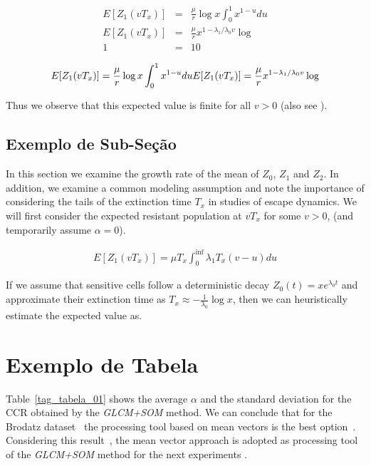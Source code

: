 \documentclass{classe_cn}                 %
\begin{document}
\begin{eqnarray}
\label{eqexpmuts}
  E [Z_1(vT_x)] &=& \frac{\mu}{r}\log x \int_0^{1} x^{1-u} du \\
  E [Z_1(vT_x)] &=& \frac{\mu}{r}x^{1-{\lambda_1}/{\lambda_0}v}\log  \\
  1 &=& 10
\end{eqnarray}

\begin{equation}
  E [Z_1(vT_x)] = \frac{\mu}{r}\log x \int_0^{1} x^{1-u} du \\
  E [Z_1(vT_x)] = \frac{\mu}{r}x^{1-{\lambda_1}/{\lambda_0}v}\log 
\end{equation}

Thus we observe that this expected value is finite for all $v>0$ (also see \cite{Rosenfeld:1970}).

\subsection{Exemplo de Sub-Seção}

In this section we examine the growth rate of the mean of $Z_0$, $Z_1$ and $Z_2$. In addition, we examine a common modeling assumption and note the importance of considering the tails of the extinction time $T_x$ in studies of escape dynamics. We will first consider the expected resistant population at $vT_x$ for some $v>0$, (and temporarily assume $\alpha=0$).

\begin{eqnarray}
E [Z_1(vT_x)]= \mu T_x \int_{0}^{\inf} \lambda_1T_x(v-u)du
\end{eqnarray}

If we assume that sensitive cells follow a deterministic decay $Z_0(t)=xe^{\lambda_0 t}$ and approximate their extinction time as $T_x\approx-\frac{1}{\lambda_0}\log x$, then we can heuristically estimate the expected value as.

\section{Exemplo de Tabela}

Table~\ref{tag_tabela_01} shows the average $ \alpha $ and the standard deviation for the CCR \cite{Rosenfeld:1970} obtained by the \textit{GLCM+SOM} method. We can conclude that for the Brodatz dataset~\cite{Domingues:2010} the processing tool based on mean vectors is the best option~\cite{Rosenfeld:1970, Diday:1989}. Considering this result~\cite{Visible:2013}, the mean vector approach is adopted as processing tool of the \textit{GLCM+SOM} method for the next experiments \cite{Fulano:2009}.
\end{document}
